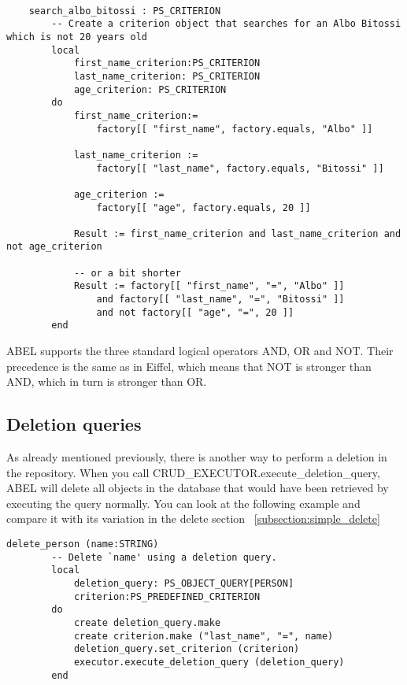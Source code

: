 \begin{lstlisting}[language=OOSC2Eiffel, captionpos=b, caption={}, label={lst:search_albo_bitossi}]

	search_albo_bitossi : PS_CRITERION
		-- Create a criterion object that searches for an Albo Bitossi which is not 20 years old
		local
			first_name_criterion:PS_CRITERION
			last_name_criterion: PS_CRITERION
			age_criterion: PS_CRITERION
		do
			first_name_criterion:= 
				factory[[ "first_name", factory.equals, "Albo" ]]

			last_name_criterion := 
				factory[[ "last_name", factory.equals, "Bitossi" ]]

			age_criterion := 
				factory[[ "age", factory.equals, 20 ]]
			
			Result := first_name_criterion and last_name_criterion and not age_criterion

			-- or a bit shorter
			Result := factory[[ "first_name", "=", "Albo" ]] 
				and factory[[ "last_name", "=", "Bitossi" ]] 
				and not factory[[ "age", "=", 20 ]]
		end
\end{lstlisting}

ABEL supports the three standard logical operators AND, OR and NOT. 
Their precedence is the same as in Eiffel, which means that NOT is stronger than AND, which in turn is stronger than OR.


\subsection{Deletion queries}
\label{subsection:deletion_query}


As already mentioned previously, there is another way to perform a deletion in the repository.
When you call CRUD\_EXECUTOR.execute\_dele\-tion\_query, ABEL will delete all objects in the database that would have been retrieved by executing the query normally.
You can look at the following example and compare it with its variation in the delete section ~\ref{subsection:simple_delete}

\begin{lstlisting}[language=OOSC2Eiffel, captionpos=b, caption={}, label={lst:deletion_query}]
	delete_person (name:STRING)
		-- Delete `name' using a deletion query.
		local
			deletion_query: PS_OBJECT_QUERY[PERSON]
			criterion:PS_PREDEFINED_CRITERION
		do
			create deletion_query.make
			create criterion.make ("last_name", "=", name)
			deletion_query.set_criterion (criterion)
			executor.execute_deletion_query (deletion_query)
		end
\end{lstlisting}

